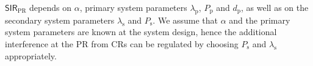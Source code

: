 \documentclass[conference, twocolumn]{IEEEtran}
\newcommand{\sub}[1]{_{\text{#1}}}
\DeclareMathOperator*{\maxi}{max}
\begin{document}
$\textsf{SIR}\sub{PR}$ depends on $\alpha$, primary system parameters $\lambda\sub{p}$, $P\sub{p}$ and $d\sub{p}$, as well as on the secondary system parameters $\lambda\sub{s}$ and $P\sub{s}$.
We assume that $\alpha$ and the primary system parameters are known at the system design, hence the additional interference at the PR from CRs can be regulated by choosing $P\sub{s}$ and $\lambda\sub{s}$ appropriately. 
\end{document}
